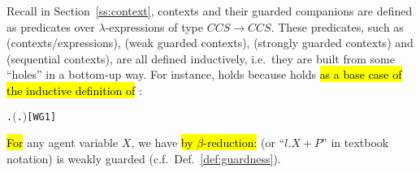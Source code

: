 Recall in Section~\ref{ss:context}, \univariate contexts and their
guarded companions are defined as predicates over $\lambda$-expressions
of type $CCS\rightarrow CCS$. These predicates, such as
(contexts/expressions),  (weak guarded contexts),
 (strongly guarded contexts) and  (sequential
contexts), are all defined inductively, i.e.~they are built from some ``holes''
in a bottom-up way. For instance, 
holds because 
holds \hl{as a base case of the inductive definition of} :
\begin{alltt}
\HOLTokenTurnstile{} \HOLSymConst{\HOLTokenForall{}}.  \ensuremath{(}\HOLTokenLambda{}. \HOLSymConst{\ensuremath{\ldotp}}\ensuremath{)}\hfill{[WG1]}
\end{alltt}
\hl{For} any agent variable $X$, we have \hl{by $\beta$-reduction:}
 (or ``$l.X + P$'' in textbook
notation) is weakly guarded (c.f.~Def.~\ref{def:guardness}).

